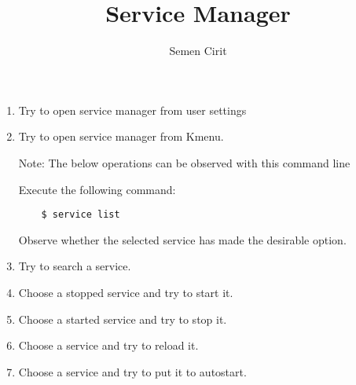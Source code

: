\documentclass[a4paper,10pt]{article}
\title{Service Manager}
\author{Semen Cirit}
\begin{document}
\maketitle
\begin{enumerate}
\item Try to open service manager from user settings

\item Try to open service manager from Kmenu.

Note: The below operations can be observed with this command line 

Execute the following command:
\begin{verbatim}
    $ service list
\end{verbatim}

Observe whether the selected service has made the desirable option.



\item Try to search a service.

\item Choose a stopped service and try to start it.

\item Choose a started service and try to stop  it.

\item Choose a service and try to reload it.

\item Choose a service and try to put it to autostart.

\end{enumerate}
\end{document}
